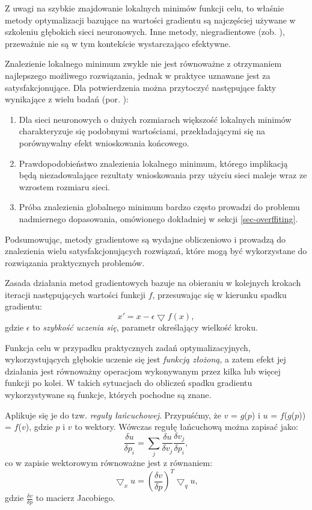 Z uwagi na szybkie znajdowanie lokalnych minimów funkcji celu, to właśnie metody optymalizacji bazujące na wartości gradientu są najczęściej używane w szkoleniu głębokich sieci neuronowych. Inne metody, niegradientowe (zob. \cite{DBLP:journals/corr/TaylorBXSPG16}), przeważnie nie są w tym kontekście wystarczająco efektywne. 

Znalezienie lokalnego minimum zwykle nie jest równoważne z otrzymaniem najlepszego możliwego rozwiązania, jednak w praktyce uznawane jest za satysfakcjonujące. Dla potwierdzenia można przytoczyć następujące fakty wynikające z wielu badań (por. \cite{DBLP:journals/corr/ChoromanskaHMAL14}):
\begin{enumerate}
	\item Dla sieci neuronowych o dużych rozmiarach większość lokalnych minimów charakteryzuje się podobnymi wartościami, przekładającymi się na porównywalny efekt wnioskowania końcowego.
	\item Prawdopodobieństwo znalezienia lokalnego minimum, którego implikacją będą niezadowalające rezultaty wnioskowania przy użyciu sieci maleje wraz ze wzrostem rozmiaru sieci.
	\item Próba znalezienia globalnego minimum bardzo często prowadzi do problemu nadmiernego dopasowania, omówionego dokładniej w sekcji \ref{sec-overffiting}.
\end{enumerate}

Podsumowując, metody gradientowe są wydajne obliczeniowo i prowadzą do znalezienia wielu satysfakcjonujących rozwiązań, które mogą być wykorzystane do rozwiązania praktycznych problemów. 

Zasada działania metod gradientowych bazuje na obieraniu w kolejnych krokach iteracji następujących wartości funkcji $f$, przesuwając się w kierunku spadku gradientu:
\begin{equation}
x' = x - \epsilon \bigtriangledown f(x),
\end{equation} 
gdzie $\epsilon$ to \textit{szybkość uczenia się}, parametr określający wielkość kroku. 

Funkcja celu w przypadku praktycznych zadań optymalizacyjnych, wykorzystujących głębokie uczenie się jest \textit{funkcją złożoną}, a zatem efekt jej działania jest równoważny operacjom wykonywanym przez kilka lub więcej funkcji po kolei. W takich sytuacjach do obliczeń spadku gradientu wykorzystywane są funkcje, których pochodne są znane.

Aplikuje się je do tzw. \textit{reguły łańcuchowej}. Przypuśćmy, że $v$ = $g$($p$) i $u$ = $f$($g$($p$)) = $f$($v$), gdzie $p$ i $v$ to wektory. Wówczas regułę łańcuchową można zapisać jako:
\begin{equation}
\frac{\delta u}{\delta p_i} = \sum_{j} \frac{\delta u}{\delta v_j} \frac{\delta v_j}{\delta p_i}, 
\end{equation}
co w zapisie wektorowym równoważne jest z równaniem:
\begin{equation}
\label{regLancuch}
\bigtriangledown_x u = (\frac{\delta v}{\delta p})^T \bigtriangledown_q u, 
\end{equation}
gdzie $\frac{\delta v}{\delta p}$ to macierz Jacobiego. 

